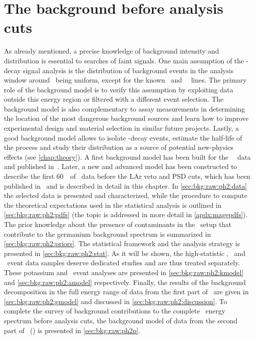 
\chapter{The background before analysis cuts}\label{chap:bkg:raw:ph2}

As already mentioned, a precise knowledge of background intensity and distribution is
essential to searches of faint signals. One main assumption of the \onbb-decay signal
analysis is the distribution of background events in the analysis window around \qbb\
being uniform, except for the known \Tl\ and \Bil\ \g\ lines. The primary role of the
background model is to verify this assumption by exploiting data outside this energy
region or filtered with a different event selection. The background model is also
complementary to assay measurements in determining the location of the most dangerous
background sources and learn how to improve experimental design and material selection in
similar future projects. Lastly, a good background model allows to isolate \nnbb-decay
events, estimate the half-life of the process and study their distribution as a source of
potential new-physics effects (see \cref{chap:theory}).
\newpar
A first background model has been built for the \gerda\ \phaseone\ data and published
in~\cite{Agostini2013a}. Later, a new and advanced model has been constructed to describe
the first 60~\kgyr\ of \phasetwo\ data before the LAr veto and PSD cuts, which has been
published in~\cite{Agostini2019b} and is described in detail in this chapter. In
\cref{sec:bkg:raw:ph2:data} the selected data is presented and characterized, while the
procedure to compute the theoretical expectations used in the statistical analysis is
outlined in \cref{sec:bkg:raw:ph2:pdfs} (the topic is addressed in more detail in
\cref{apdx:magepdfs}). The prior knowledge about the presence of contaminants in the
\gerda\ setup that contribute to the germanium background spectrum is summarized in
\cref{sec:bkg:raw:ph2:priors}. The statistical framework and the analysis strategy is
presented in \cref{sec:bkg:raw:ph2:stat}. As it will be shown, the high-statistic \kvn,
\kvz\ and \a\ event data samples deserve dedicated studies and are thus treated
separately. These potassium and \a\ event analyses are presented in
\cref{sec:bkg:raw:ph2:kmodel} and \cref{sec:bkg:raw:ph2:amodel} respectively. Finally, the
results of the background decomposition in the full energy range of data from the first
part of \phasetwo\ are given in \cref{sec:bkg:raw:ph2:gmodel} and discussed in
\cref{sec:bkg:raw:ph2:discussion}. To complete the survey of background contributions to
the complete \gerdatwo\ energy spectrum before analysis cuts, the background model of data
from the second part of \phasetwo\ (\phasetwop) is presented in \cref{sec:bkg:raw:ph2p}.

